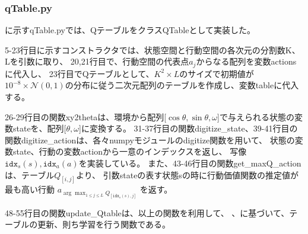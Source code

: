 \documentclass[a4paper,11pt]{jsarticle}
\begin{document}
\subsubsection{qTable.py} \label{sec:qTable}
に示すqTable.pyでは、QテーブルをクラスQTableとして実装した。
\par
5-23行目に示すコンストラクタでは、状態空間と行動空間の各次元の分割数K、Lを引数に取り、
20,21行目で、行動空間の代表点$a_j$からなる配列を変数actionsに代入し、
23行目でQテーブルとして、$K^2\times L$のサイズで初期値が$10^{-8}\times\mathcal{N}(0,1)$の分布に従う二次元配列のテーブルを作成し、変数tableに代入する。\par
26-29行目の関数xy2thetaは、環境から配列[$\cos \theta, \sin \theta, \omega$]で与えられる状態の変数stateを、配列[$\theta, \omega$]に変換する。
31-37行目の関数digitize\_state、39-41行目の関数digitize\_actionは、各々numpyモジュールのdigitize関数を用いて、
状態の変数state、行動の変数actionから一意のインデックスを返し、
写像$\mathtt{idx}_s(s),\mathtt{idx}_a(a)$を実装している。
また、43-46行目の関数get\_maxQ\_actionは、テーブル$Q_{[i,j]}$より、
引数stateの表す状態sの時に行動価値関数の推定値が最も高い行動
$a_{\arg\max_{1\leq j\leq L} Q_{[\mathtt{idx}_s(s), j]}}$
を返す。
\par
48-55行目の関数update\_Qtableは、以上の関数を利用して、
、に基づいて、テーブルの更新、則ち学習を行う関数である。


\end{document}
